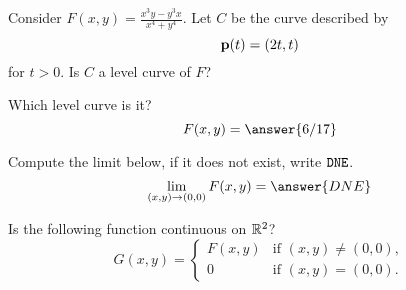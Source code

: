 \documentclass{ximera}
\author{Jim Talamo \and Bart Snapp}
\begin{document}
\begin{exercise}
  Consider $F(x,y) = \frac{x^3 y - y^3 x}{x^4+y^4}$. Let $C$ be the
  curve described by
  \[
  \mathbf{p}(t) = \left(2t,t\right)
  \]
  for $t> 0$. Is $C$ a level curve of $F$?
  \begin{multipleChoice}
  \end{multipleChoice}
  \begin{exercise}
    Which level curve is it?
    \[
    F(x,y) = \answer{6/17}
    \]
  \end{exercise}
  \begin{exercise}
    Compute the limit below, if it does not exist, write $\verb|DNE|$.
    \[
    \lim_{\point{x,y}\to \point{0,0}} F(x,y) = \answer{DNE}
    \]
  \end{exercise}
  \begin{exercise}
    Is the following function continuous on $\mathbb R^2$?
    \[
    G(x,y) =
    \begin{cases}
      F(x,y) &\text{if $(x,y)\ne (0,0)$},\\
      0 &\text{if $(x,y) = (0,0)$}.
    \end{cases}
    \]
    \begin{multipleChoice}
    \end{multipleChoice}
  \end{exercise}
\end{exercise}
\end{document}
